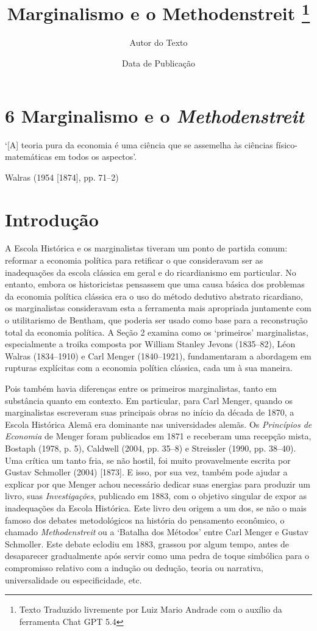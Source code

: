 \documentclass[12pt]{article}
\title{Marginalismo e o Methodenstreit \thanks{Texto Traduzido livremente por Luiz Mario Andrade com o auxílio da ferramenta Chat GPT 5.4}}
\author{Autor do Texto}
\date{Data de Publicação}
\begin{document}
\maketitle

\section*{6 \quad Marginalismo e o \textit{Methodenstreit}}

‘[A] teoria pura da economia é uma ciência que se assemelha às ciências físico-matemáticas em todos os aspectos’.

\hspace{8cm} Walras (1954 [1874], pp. 71–2)

\section{Introdução}

A Escola Histórica e os marginalistas tiveram um ponto de partida comum: reformar a economia política para retificar o que consideravam ser as inadequações da escola clássica em geral e do ricardianismo em particular. No entanto, embora os historicistas pensassem que uma causa básica dos problemas da economia política clássica era o uso do método dedutivo abstrato ricardiano, os marginalistas consideravam esta a ferramenta mais apropriada juntamente com o utilitarismo de Bentham, que poderia ser usado como base para a reconstrução total da economia política. A Seção 2 examina como os ‘primeiros’ marginalistas, especialmente a troika composta por William Stanley Jevons (1835–82), Léon Walras (1834–1910) e Carl Menger (1840–1921), fundamentaram a abordagem em rupturas explícitas com a economia política clássica, cada um à sua maneira.

Pois também havia diferenças entre os primeiros marginalistas, tanto em substância quanto em contexto. Em particular, para Carl Menger, quando os marginalistas escreveram suas principais obras no início da década de 1870, a Escola Histórica Alemã era dominante nas universidades alemãs. Os \textit{Princípios de Economia} de Menger foram publicados em 1871 e receberam uma recepção mista, Bostaph (1978, p. 5), Caldwell (2004, pp. 35–8) e Streissler (1990, pp. 38–40). Uma crítica um tanto fria, se não hostil, foi muito provavelmente escrita por Gustav Schmoller (2004) [1873]. E isso, por sua vez, também pode ajudar a explicar por que Menger achou necessário dedicar suas energias para produzir um livro, suas \textit{Investigações}, publicado em 1883, com o objetivo singular de expor as inadequações da Escola Histórica. Este livro deu origem a um dos, se não o mais famoso dos debates metodológicos na história do pensamento econômico, o chamado \textit{Methodenstreit} ou a ‘Batalha dos Métodos’ entre Carl Menger e Gustav Schmoller. Este debate eclodiu em 1883, grassou por algum tempo, antes de desaparecer gradualmente após servir como uma pedra de toque simbólica para o compromisso relativo com a indução ou dedução, teoria ou narrativa, universalidade ou especificidade, etc.
\end{document}
